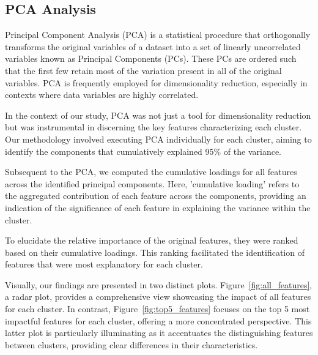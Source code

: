 \documentclass[12pt]{article}
\begin{document}
\subsection{PCA Analysis}

Principal Component Analysis (PCA) is a statistical procedure that orthogonally transforms the original variables of a dataset into a set of linearly uncorrelated variables known as Principal Components (PCs). These PCs are ordered such that the first few retain most of the variation present in all of the original variables. PCA is frequently employed for dimensionality reduction, especially in contexts where data variables are highly correlated.

In the context of our study, PCA was not just a tool for dimensionality reduction but was instrumental in discerning the key features characterizing each cluster. Our methodology involved executing PCA individually for each cluster, aiming to identify the components that cumulatively explained 95\% of the variance.

Subsequent to the PCA, we computed the cumulative loadings for all features across the identified principal components. Here, 'cumulative loading' refers to the aggregated contribution of each feature across the components, providing an indication of the significance of each feature in explaining the variance within the cluster.

To elucidate the relative importance of the original features, they were ranked based on their cumulative loadings. This ranking facilitated the identification of features that were most explanatory for each cluster.

Visually, our findings are presented in two distinct plots. 
Figure~\ref{fig:all_features}, a radar plot, provides a comprehensive view showcasing the impact of all features for each cluster. 
In contrast, Figure~\ref{fig:top5_features} focuses on the top 5 most impactful features for each cluster, offering a more concentrated perspective. This latter plot is particularly illuminating as it accentuates the distinguishing features between clusters, providing clear differences in their characteristics.
\newpage
\end{document}
